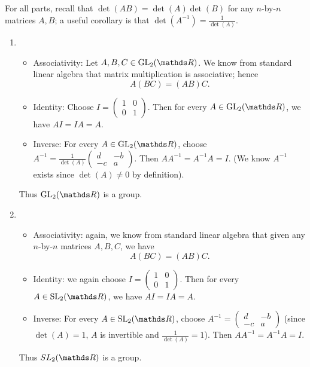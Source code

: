 \documentclass{homework}
\begin{document}
\begin{solution}
  For all parts, recall that $\det(AB)=\det(A)\det(B)$ for any $n$-by-$n$ matrices $A,B$; a useful
  corollary is that $\det(A^{-1})=\frac{1}{\det(A)}$.
  \begin{enumerate}[label=(\alph*)]
    \item 
      \begin{itemize}
        \item Associativity: Let $A,B,C\in \GL_2(\R)$. We know from standard linear algebra that
          matrix multiplication is associative; hence \[
            A(BC)=(AB)C
          .\] 
        \item Identity: Choose $I=\begin{pmatrix} 1&0\\0&1 \end{pmatrix} $. Then for every $A\in
          \GL_2(\R)$, we have $AI=IA=A$.
        \item Inverse:  For every $A\in \GL_2(\R)$, choose $A^{-1}=\frac{1}{\det(A)}\begin{pmatrix}
          d&-b\\-c&a\end{pmatrix}$. Then $AA^{-1}=A^{-1}A=I$. (We know $A^{-1}$ exists since
          $\det(A)\neq 0$ by definition).
      \end{itemize}
      Thus $\GL_2(\R)$ is a group.
    \item
      \begin{itemize}
        \item Associativity: again, we know from standard linear algebra that given any $n$-by-$n$ 
          matrices $A,B,C$, we have \[
            A(BC)=(AB)C
          .\] 
        \item Identity: we again choose $I=\begin{pmatrix} 1&0\\0&1 \end{pmatrix} $. Then for every
          $A\in \SL_2(\R)$, we have $AI=IA=A$.
        \item Inverse: For every $A\in \SL_2(\R)$, choose $A^{-1}=\begin{pmatrix} d&-b\\-c&a
          \end{pmatrix} $ (since $\det(A)=1$, $A$ is invertible and $\frac{1}{\det(A)}=1$). Then
          $AA^{-1}=A^{-1}A=I$.
      \end{itemize}
      Thus $SL_2(\R)$ is a group.


\end{enumerate}
\end{solution}
\end{document}
